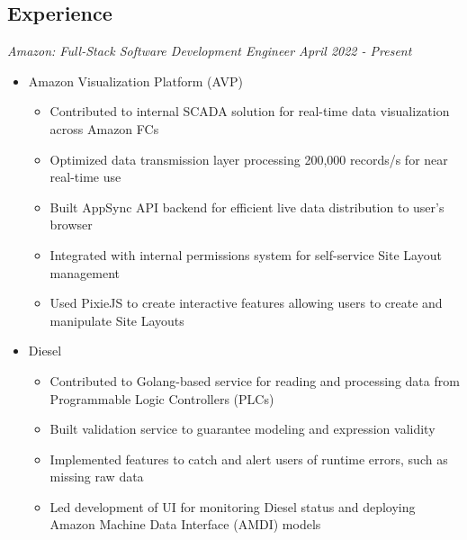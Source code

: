 \documentclass[line,overlapped]{res}
\begin{document}
\setlength\itemsep{.25em}
\address{Email: kllinzy1@gmail.com \hfill Mobile: (918) 440-3563}

\begin{resume}
  \section{Experience}
  {\sl Amazon: Full-Stack Software Development Engineer \hfill April 2022 - Present} 
    \begin{itemize}[leftmargin=*] 
      \item[] Amazon Visualization Platform (AVP) 
      \begin{itemize} 
        \setlength\itemsep{.1em} 
        \item Contributed to internal SCADA solution for real-time data visualization across Amazon FCs 
        \item Optimized data transmission layer processing 200,000 records/s for near real-time use 
        \item Built AppSync API backend for efficient live data distribution to user's browser 
        \item Integrated with internal permissions system for self-service Site Layout management 
        \item Used PixieJS to create interactive features allowing users to create and manipulate Site Layouts 
      \end{itemize} \item[] Diesel 
      \begin{itemize} 
        \setlength\itemsep{.1em} 
        \item Contributed to Golang-based service for reading and processing data from Programmable Logic Controllers (PLCs) 
        \item Built validation service to guarantee modeling and expression validity 
        \item Implemented features to catch and alert users of runtime errors, such as missing raw data 
        \item Led development of UI for monitoring Diesel status and deploying Amazon Machine Data Interface (AMDI) models 
      \end{itemize} 
    \end{itemize}


\end{resume}
\end{document}
